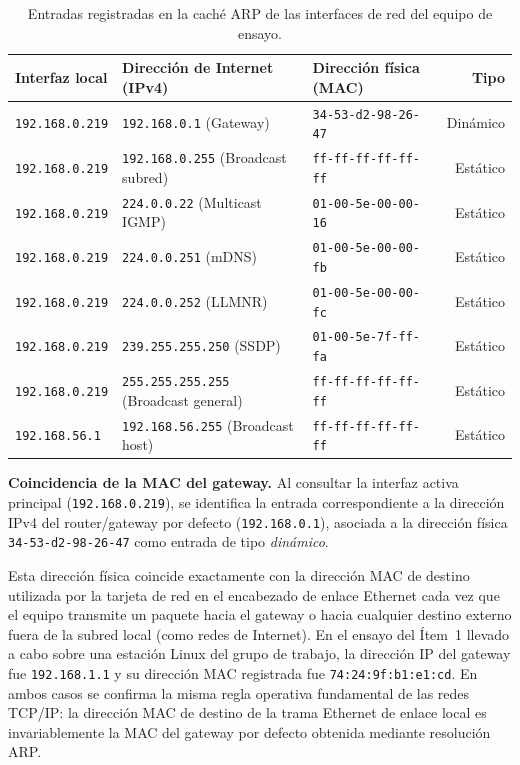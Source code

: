 \documentclass[12pt,a4paper]{article}
\begin{document}
\begin{table}[H]
\centering\footnotesize
\setlength{\tabcolsep}{4pt}
\begin{tabular}{@{}lllr@{}}
\toprule
\textbf{Interfaz local} & \textbf{Dirección de Internet (IPv4)} & \textbf{Dirección física (MAC)} & \textbf{Tipo} \\
\midrule
\texttt{192.168.0.219} & \texttt{192.168.0.1} (Gateway) & \texttt{34-53-d2-98-26-47} & Dinámico \\
\texttt{192.168.0.219} & \texttt{192.168.0.255} (Broadcast subred) & \texttt{ff-ff-ff-ff-ff-ff} & Estático \\
\texttt{192.168.0.219} & \texttt{224.0.0.22} (Multicast IGMP) & \texttt{01-00-5e-00-00-16} & Estático \\
\texttt{192.168.0.219} & \texttt{224.0.0.251} (mDNS) & \texttt{01-00-5e-00-00-fb} & Estático \\
\texttt{192.168.0.219} & \texttt{224.0.0.252} (LLMNR) & \texttt{01-00-5e-00-00-fc} & Estático \\
\texttt{192.168.0.219} & \texttt{239.255.255.250} (SSDP) & \texttt{01-00-5e-7f-ff-fa} & Estático \\
\texttt{192.168.0.219} & \texttt{255.255.255.255} (Broadcast general) & \texttt{ff-ff-ff-ff-ff-ff} & Estático \\
\midrule
\texttt{192.168.56.1} & \texttt{192.168.56.255} (Broadcast host) & \texttt{ff-ff-ff-ff-ff-ff} & Estático \\
\bottomrule
\end{tabular}
\caption{Entradas registradas en la caché ARP de las interfaces de red del equipo de ensayo.}
\label{tab:arp-cache-local}
\end{table}

\textbf{Coincidencia de la MAC del gateway.}
Al consultar la interfaz activa principal (\texttt{192.168.0.219}), se identifica la entrada correspondiente a la dirección IPv4 del router/gateway por defecto (\texttt{192.168.0.1}), asociada a la dirección física \texttt{34-53-d2-98-26-47} como entrada de tipo \emph{dinámico}.

Esta dirección física coincide exactamente con la dirección MAC de destino utilizada por la tarjeta de red en el encabezado de enlace Ethernet cada vez que el equipo transmite un paquete hacia el gateway o hacia cualquier destino externo fuera de la subred local (como redes de Internet). En el ensayo del Ítem~1 llevado a cabo sobre una estación Linux del grupo de trabajo, la dirección IP del gateway fue \texttt{192.168.1.1} y su dirección MAC registrada fue \texttt{74:24:9f:b1:e1:cd}. En ambos casos se confirma la misma regla operativa fundamental de las redes TCP/IP: la dirección MAC de destino de la trama Ethernet de enlace local es invariablemente la MAC del gateway por defecto obtenida mediante resolución ARP.
\end{document}
